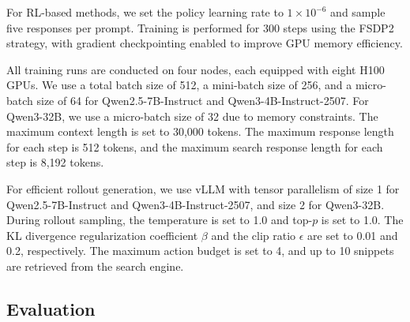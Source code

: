 For RL-based methods, we set the policy learning rate to $1\times10^{-6}$ and sample five responses per prompt. Training is performed for 300 steps using the FSDP2 strategy, with gradient checkpointing enabled to improve GPU memory efficiency.

All training runs are conducted on four nodes, each equipped with eight H100 GPUs. We use a total batch size of 512, a mini-batch size of 256, and a micro-batch size of 64 for Qwen2.5-7B-Instruct and Qwen3-4B-Instruct-2507. For Qwen3-32B, we use a micro-batch size of 32 due to memory constraints. The maximum context length is set to 30,000 tokens. The maximum response length for each step is 512 tokens, and the maximum search response length for each step is 8,192 tokens.

For efficient rollout generation, we use vLLM \citep{vllm} with tensor parallelism of size 1 for Qwen2.5-7B-Instruct and Qwen3-4B-Instruct-2507, and size 2 for Qwen3-32B. During rollout sampling, the temperature is set to 1.0 and top-$p$ is set to 1.0. The KL divergence regularization coefficient $\beta$ and the clip ratio $\epsilon$ are set to 0.01 and 0.2, respectively. The maximum action budget is set to 4, and up to 10 snippets are retrieved from the search engine.

\newpage
\subsection{Evaluation}
\label{appendix:evaluator_prompt}

